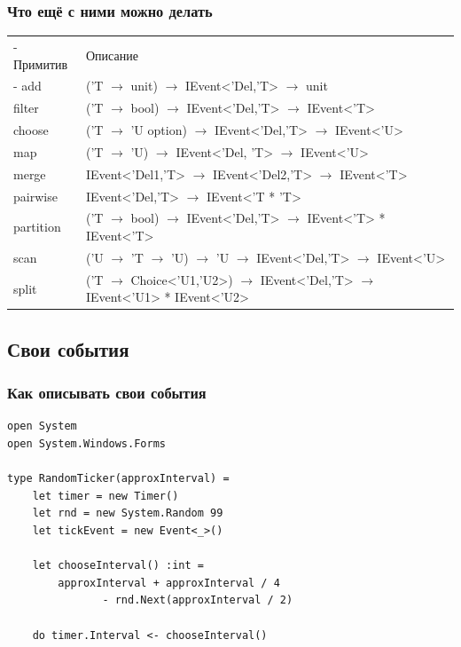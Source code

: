 \documentclass[xetex,mathserif,serif]{beamer}
\begin{document}
	\begin{frame}
		\frametitle{Что ещё с ними можно делать}
		\begin{footnotesize}
			\begin{tabu} {| X[0.3 l p] | X[1 l p] |}
				\tabucline-
				Примитив  & Описание           \\
				\tabucline-
				\everyrow{\tabucline-}
				add       & ('T $\to$ unit) $\to$ IEvent<'Del,'T> $\to$ unit                                 \\
				filter    & ('T $\to$ bool) $\to$ IEvent<'Del,'T> $\to$ IEvent<'T>                           \\
				choose    & ('T $\to$ 'U option) $\to$ IEvent<'Del,'T> $\to$ IEvent<'U>                      \\
				map       & ('T $\to$ 'U) $\to$ IEvent<'Del, 'T> $\to$ IEvent<'U>                            \\
				merge     & IEvent<'Del1,'T> $\to$ IEvent<'Del2,'T> $\to$ IEvent<'T>                         \\
				pairwise  & IEvent<'Del,'T> $\to$ IEvent<'T * 'T>                                            \\
				partition & ('T $\to$ bool) $\to$ IEvent<'Del,'T> $\to$ IEvent<'T> * IEvent<'T>              \\
				scan      & ('U $\to$ 'T $\to$ 'U) $\to$ 'U $\to$ IEvent<'Del,'T> $\to$ IEvent<'U>           \\
				split     & ('T $\to$ Choice<'U1,'U2>) $\to$ IEvent<'Del,'T> $\to$ IEvent<'U1> * IEvent<'U2> \\
			\end{tabu}
		\end{footnotesize}
	\end{frame}

	\subsection{Свои события}

	\begin{frame}[fragile]
		\frametitle{Как описывать свои события}
		\begin{verbatim}
open System
open System.Windows.Forms

type RandomTicker(approxInterval) =
    let timer = new Timer()
    let rnd = new System.Random 99
    let tickEvent = new Event<_>()

    let chooseInterval() :int =
        approxInterval + approxInterval / 4
               - rnd.Next(approxInterval / 2)

    do timer.Interval <- chooseInterval()
		\end{verbatim}
\end{frame}
\end{document}
